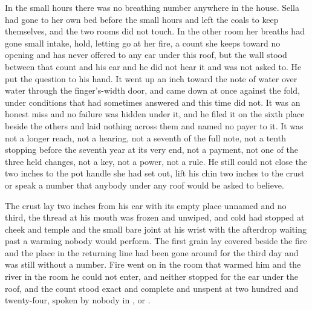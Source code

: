 \scenebreak

In the small hours there was no breathing number anywhere in the house. Sella had gone to her own bed before the small hours and left the coals to keep themselves, and the two rooms did not touch. In the other room her breaths had gone small intake, hold, letting go at her fire, a count she keeps toward no opening and has never offered to any ear under this roof, but the wall stood between that count and his ear and he did not hear it and was not asked to. He put the question to his hand. It went up an inch toward the note of water over water through the finger's-width door, and came down at once against the fold, under conditions that had sometimes answered and this time did not. It was an honest miss and no failure was hidden under it, and he filed it on the sixth place beside the others and laid nothing across them and named no payer to it. It was not a longer reach, not a hearing, not a seventh of the full note, not a tenth stopping before the seventh year at its very end, not a payment, not one of the three held changes, not a key, not a power, not a rule. He still could not close the two inches to the pot handle she had set out, lift his chin two inches to the crust or speak a number that anybody under any roof would be asked to believe.

The crust lay two inches from his ear with its empty place unnamed and no third, the thread at his mouth was frozen and unwiped, and cold had stopped at cheek and temple and the small bare joint at his wrist with the afterdrop waiting past a warming nobody would perform. The first grain lay covered beside the fire and the place in the returning line had been gone around for the third day and was still without a number. Fire went on in the room that warmed him and the river in the room he could not enter, and neither stopped for the ear under the roof, and the count stood exact and complete and unspent at two hundred and twenty-four, spoken by nobody in ,  or .

